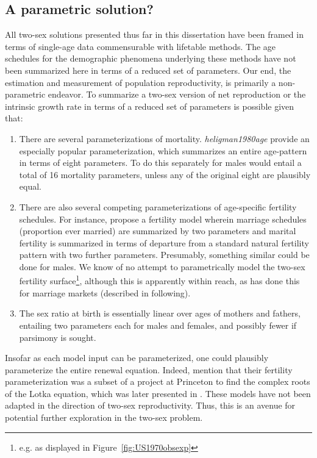 \subsection{A parametric solution?} 
All two-sex solutions presented thus far in
this dissertation have been framed in terms of single-age data commensurable with lifetable
methods. The age schedules for the demographic phenomena underlying these
methods have not been summarized here in terms of a reduced set of parameters.
Our end, the estimation and measurement of population reproductivity, is primarily 
a non-parametric endeavor. To summarize a two-sex version of net reproduction or
the intrinsic growth rate in terms of a reduced set of parameters is
possible given that: 
\begin{enumerate}
  \item There are several parameterizations of mortality.
  \textit{heligman1980age} provide an especially popular parameterization, which 
  summarizes an entire age-pattern in terms of eight parameters. To do this
  separately for males would entail a total of 16 mortality parameters, unless
  any of the original eight are plausibly equal.
  \item There are also several competing parameterizations of age-specific
  fertility schedules. For instance, \citet{coale1974model} propose a fertility
  model wherein marriage schedules (proportion ever married) are summarized by
  two parameters and marital fertility is summarized in terms of departure from
  a standard natural fertility pattern with two further parameters. Presumably,
  something similar could be done for males. We know of no attempt to
  parametrically model the two-sex fertility surface\footnote{e.g. as displayed
  in Figure~\ref{fig:US1970obsexp}}, although this is apparently within reach,
  as \citet{marriage1981warren,
sanderson1983two} has done this for marriage markets (described in following).
  \item The sex ratio at birth is essentially linear over ages of mothers and
  fathers, entailing two parameters each for males and females, and possibly
  fewer if parsimony is sought.
\end{enumerate}

Insofar as each model input can be parameterized, one could plausibly
parameterize the entire renewal equation. Indeed, \citet{coale1974model} mention
that their fertility parameterization was a subset of a project at
Princeton to find the complex roots of the Lotka equation, which
was later presented in \citet{james1977determinants}. These models have not 
been adapted in the direction of two-sex reproductivity. Thus, this is an avenue
for potential further exploration in the two-sex problem.

